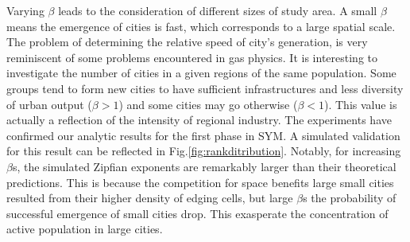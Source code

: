 \documentclass[reprint,unsortedaddress,amsmath,amssymb,aps,prl,showkeys]{revtex4-2}
\begin{document}
Varying $\beta$ leads to the consideration of different sizes of study area. A small $\beta$ means the emergence of cities is fast, which corresponds to a large spatial scale. The problem of determining the relative speed of city's generation, is very reminiscent of some problems encountered in gas physics. It is interesting to investigate the number of cities in a given regions of the same population. Some groups tend to form new cities to have sufficient infrastructures and less diversity of urban output ($\beta > 1$) and some cities may go otherwise ($\beta< 1$). This value is actually a reflection of the intensity of regional industry. The experiments have confirmed our analytic results for the first phase in SYM. A simulated validation for this result can be reflected in Fig.\@\ref{fig:rankditribution}. Notably, for increasing $\beta$s, the simulated Zipfian exponents are remarkably larger than their theoretical predictions. This is because the competition for space benefits large small cities resulted from their higher density of edging cells, but large $\beta$s the probability of successful emergence of small cities drop. This exasperate the concentration of active population in large cities.
\end{document}
